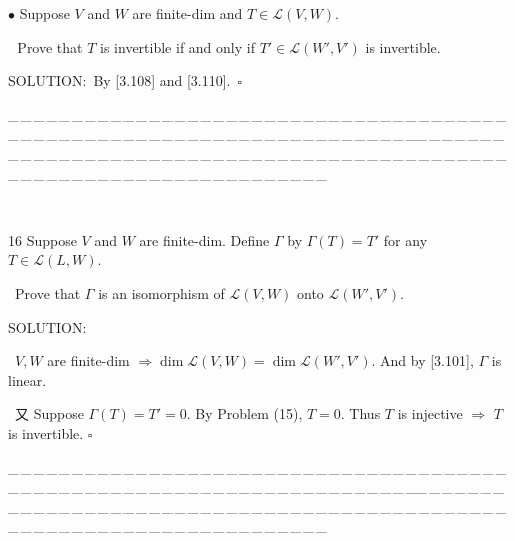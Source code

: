 \documentclass[a4paper, 11pt, UTF8]{article}
\def\Lm{\mathcal{L}}
\begin{document}
\begin{large}
{\small$\bullet$} {\timessl\Large
Suppose $V$ and $W$ are finite-dim and $T\in\Lm(V,W)$.}\par\,\,
{\timessl\Large
Prove that $T$ is invertible if and only if $T'\in\Lm(W',V')$ is invertible.}\par
{\timesbf S\footnotesize{OLUTION:}}\,\,\,By [3.108] and [3.110].\,\,\,$\square$\par
 {\tiny \_\,\_\,\_\,\_\,\_\,\_\,\_\,\_\,\_\,\_\,\_\,\_\,\_\,\_\,\_\,\_\,\_\,\_\,\_\,\_\,\_\,\_\,\_\,\_\,\_\,\_\,\_\,\_\,\_\,\_\,\_\,\_\,\_\,\_\,\_\,\_\,\_\,\_\,\_\,\_\,\_\,\_\,\_\,\_\,\_\,\_\,\_\,\_\,\_\,\_\,\_\,\_\,\_\,\_\,\_\,\_\,\_\,\_\,\_\,\_\,\_\,\_\,\_\,\_\,\_\,\_\,\_\,\_\,\_\,\_\,\_\_\,\_\,\_\,\_\,\_\,\_\,\_\,\_\,\_\,\_\,\_\,\_\,\_\,\_\,\_\,\_\,\_\,\_\,\_\,\_\,\_\,\_\,\_\,\_\,\_\,\_\,\_\,\_\,\_\,\_\,\_\,\_\,\_\,\_\,\_\,\_\,\_\,\_\,\_\,\_\,\_\,\_\,\_\,\_\,\_\,\_\,\_\,\_\,\_\,\_\,\_\,\_\,\_\,\_\,\_\,\_\,\_\,\_\,\_\,\_\,\_\,\_\,\_\,\_\,\_\,\_\,\_\,\_\,\_\,\_\,\_}{\tiny\,\par}
{\timesbf\Large 16} {\timessl\Large
Suppose $V$ and $W$ are finite-dim. Define $\Gamma$ by $\Gamma(T)=T'$ for any $T\in\Lm(L,W)$. }\par\quad
{\timessl \Large\, Prove that $\Gamma$ is an isomorphism of $\Lm(V,W)$ onto $\Lm(W',V')$.
}\par
{\timesbf S\footnotesize{OLUTION:}}\par\quad\,
$V,W$ are finite-dim $\Rightarrow\dim\Lm(V,W)=\dim\Lm(W',V')$. And by [3.101], $\Gamma$ is linear.\par\quad\, 
又 Suppose $\Gamma(T)=T'=0$. By Problem (15), $T=0$. Thus $T$ is injective $\Rightarrow$ $T$ is invertible. \quad$\square$

 {\tiny \_\,\_\,\_\,\_\,\_\,\_\,\_\,\_\,\_\,\_\,\_\,\_\,\_\,\_\,\_\,\_\,\_\,\_\,\_\,\_\,\_\,\_\,\_\,\_\,\_\,\_\,\_\,\_\,\_\,\_\,\_\,\_\,\_\,\_\,\_\,\_\,\_\,\_\,\_\,\_\,\_\,\_\,\_\,\_\,\_\,\_\,\_\,\_\,\_\,\_\,\_\,\_\,\_\,\_\,\_\,\_\,\_\,\_\,\_\,\_\,\_\,\_\,\_\,\_\,\_\,\_\,\_\,\_\,\_\,\_\,\_\_\,\_\,\_\,\_\,\_\,\_\,\_\,\_\,\_\,\_\,\_\,\_\,\_\,\_\,\_\,\_\,\_\,\_\,\_\,\_\,\_\,\_\,\_\,\_\,\_\,\_\,\_\,\_\,\_\,\_\,\_\,\_\,\_\,\_\,\_\,\_\,\_\,\_\,\_\,\_\,\_\,\_\,\_\,\_\,\_\,\_\,\_\,\_\,\_\,\_\,\_\,\_\,\_\,\_\,\_\,\_\,\_\,\_\,\_\,\_\,\_\,\_\,\_\,\_\,\_\,\_\,\_\,\_\,\_\,\_\,\_}\par


\end{large}
\end{document}
